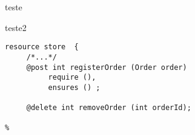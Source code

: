 \documentclass{article}
\begin{document}
teste

teste2
\begin{lstlisting}[language=NeoIDL, style=NeoIDLstyle, caption=Basedo em Spec\#] 
   resource store  {
     /*...*/
     @post int registerOrder (Order order)
          require (),
          ensures () ;

     @delete int removeOrder (int orderId);

%
\end{lstlisting}
\end{document}
